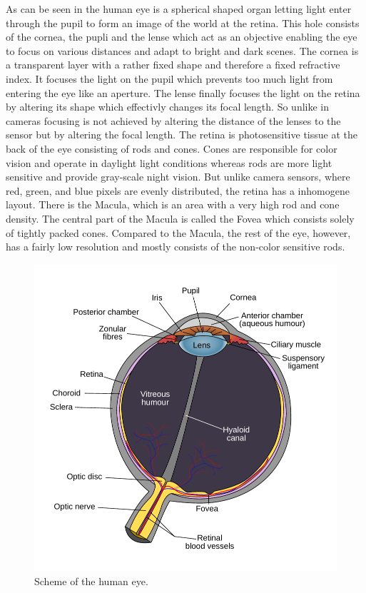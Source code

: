 \documentclass{acm_proc_article-sp}
\begin{document}
As can be seen in  the human eye is a spherical shaped organ letting light enter through the pupil to form an image of the world at the retina.
This hole consists of the cornea, the pupli and the lense which act as an objective enabling the eye to focus on various distances and adapt to bright and dark scenes.
The cornea is a transparent layer with a rather fixed shape and therefore a fixed refractive index.
It focuses the light on the pupil which prevents too much light from entering the eye like an aperture.
The lense finally focuses the light on the retina by altering its shape which effectivly changes its focal length.
So unlike in cameras focusing is not achieved by altering the distance of the lenses to the sensor but by altering the focal length.
The retina is photosensitive tissue at the back of the eye consisting of rods and cones.
Cones are responsible for color vision and operate in daylight light conditions whereas rods are more light sensitive and provide gray-scale night vision.
But unlike camera sensors, where red, green, and blue pixels are evenly distributed, the retina has a inhomogene layout.
There is the Macula, which is an area with a very high rod and cone density.
The central part of the Macula is called the Fovea which consists solely of tightly packed cones.
Compared to the Macula, the rest of the eye, however, has a fairly low resolution and mostly consists of the non-color sensitive rods.


\begin{figure}
    \centering
    \includegraphics[width=\columnwidth]{human_eye_scheme.pdf}
    \caption{Scheme of the human eye.}
    \label{fig:humaneye}
\end{figure}
%
%
\end{document}

